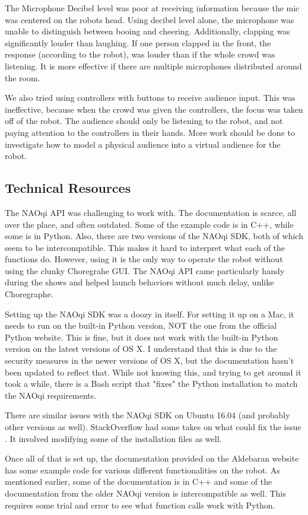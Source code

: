     The Microphone Decibel level was poor at receiving information because the mic was centered on the robots head.
    Using decibel level alone, the microphone was unable to distinguish between booing and cheering.
    Additionally, clapping was significantly louder than laughing.
    If one person clapped in the front, the response (according to the robot), was louder than if the whole crowd was listening.
    It is more effective if there are multiple microphones distributed around the room.


    We also tried using controllers with buttons to receive audience input.
    This was ineffective, because when the crowd was given the controllers, the focus was taken off of the robot.
    The audience should only be listening to the robot, and not paying attention to the controllers in their hands.
    More work should be done to investigate how to model a physical audience into a virtual audience for the robot.

\subsection{Technical Resources}

    The NAOqi API was challenging to work with. The documentation is scarce, all over the place, and often outdated.
    Some of the example code is in C++, while some is in Python. Also, there are two versions of the NAOqi SDK, both of which seem to be intercompatible.
    This makes it hard to interpret what each of the functions do.
    However, using it is the only way to operate the robot without using the clunky Choregrahe GUI.
    The NAOqi API came particularly handy during the shows and helped launch behaviors without much delay, unlike Choregraphe.

    Setting up the NAOqi SDK was a doozy in itself. For setting it up on a Mac, it needs to run on the built-in Python version,
    NOT the one from the official Python website. This is fine, but it does not work with the built-in Python version on the latest versions of OS X.
    I understand that this is due to the security measures in the newer versions of OS X, but the documentation hasn't been updated to reflect that.
    While not knowing this, and trying to get around it took a while, there is a Bash script \cite{BashScript}
    that "fixes" the Python installation to match the NAOqi requirements.

    There are similar issues with the NAOqi SDK on Ubuntu 16.04 (and probably other versions as well). StackOverflow had some takes
    on what could fix the issue \cite{naoUbuntu}. It involved modifying some of the installation files as well.

    Once all of that is set up, the documentation provided on the Aldebaran website \cite{AldebaranDoc} has some example code for various different functionalities on the robot.
    As mentioned earlier, some of the documentation is in C++ and some of the documentation from the older NAOqi version is intercompatible as well.
    This requires some trial and error to see what function calls work with Python.

